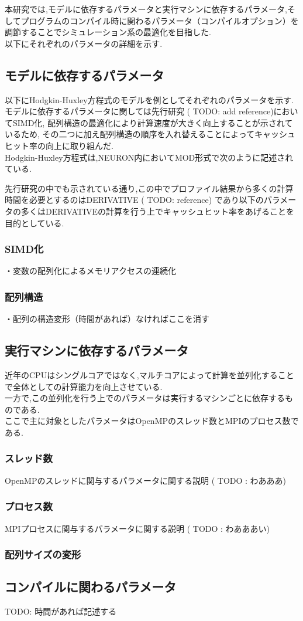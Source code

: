 本研究では,モデルに依存するパラメータと実行マシンに依存するパラメータ,そしてプログラムのコンパイル時に関わるパラメータ（コンパイルオプション）を調節することでシミュレーション系の最適化を目指した.\\
以下にそれぞれのパラメータの詳細を示す.\\
\subsection{モデルに依存するパラメータ}
以下にHodgkin-Huxley方程式のモデルを例としてそれぞれのパラメータを示す.\\
モデルに依存するパラメータに関しては先行研究 ( TODO: add reference)においてSIMD化, 配列構造の最適化により計算速度が大きく向上することが示されているため,
その二つに加え配列構造の順序を入れ替えることによってキャッシュヒット率の向上に取り組んだ.\\
Hodgkin-Huxley方程式は,NEURON内においてMOD形式で次のように記述されている.\\
{\footnotesize

}
先行研究の中でも示されている通り,この中でプロファイル結果から多くの計算時間を必要とするのはDERIVATIVE ( TODO: reference)
であり以下のパラメータの多くはDERIVATIVEの計算を行う上でキャッシュヒット率をあげることを目的としている.\\
\subsubsection{SIMD化}

・変数の配列化によるメモリアクセスの連続化
\subsubsection{配列構造}

・配列の構造変形（時間があれば）なければここを消す
\subsection{実行マシンに依存するパラメータ}
近年のCPUはシングルコアではなく,マルチコアによって計算を並列化することで全体としての計算能力を向上させている.\\
一方で,この並列化を行う上でのパラメータは実行するマシンごとに依存するものである.\\
ここで主に対象としたパラメータはOpenMPのスレッド数とMPIのプロセス数である.\\
\subsubsection{スレッド数}
OpenMPのスレッドに関与するパラメータに関する説明 ( TODO : わあああ)
\subsubsection{プロセス数}
MPIプロセスに関与するパラメータに関する説明 ( TODO : わあああい)
\subsubsection{配列サイズの変形}

\subsection{コンパイルに関わるパラメータ}
TODO: 時間があれば記述する
